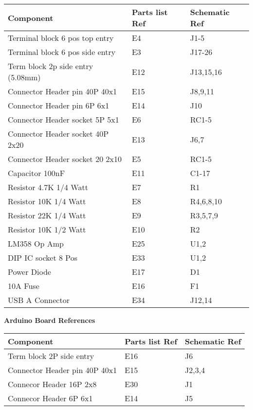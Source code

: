 \documentclass{article}
\begin{document}
\begin{table}[H]
	\centering
	\begin{tabular}{| l | l | l | }
		\hline 
		\textbf{Component} & \textbf{Parts list Ref} & \textbf{Schematic Ref} \\ \hline
		Terminal block 6 pos top entry  & E4 & J1-5 \\ \hline
		Terminal block 6 pos side entry & E3 & J17-26 \\ \hline
		Term block 2p side entry (5.08mm) & E12 & J13,15,16 \\ \hline
		Connector Header pin 40P 40x1 & E15 & J8,9,11 \\ \hline
		Connector Header pin 6P 6x1 & E14 & J10 \\ \hline
		Connector Header socket 5P 5x1 & E6 & RC1-5 \\ \hline
		Connector Header socket 40P 2x20 & E13 & J6,7 \\ \hline
		Connector Header socket 20 2x10 & E5 & RC1-5 \\ \hline
		Capacitor 100nF & E11 & C1-17 \\ \hline
		Resistor 4.7K 1/4 Watt  & E7 & R1 \\ \hline
		Resistor 10K 1/4 Watt & E8 & R4,6,8,10 \\ \hline
		Resistor 22K 1/4 Watt & E9 & R3,5,7,9 \\ \hline
		Resistor 10K 1/2 Watt & E10 & R2 \\ \hline
		LM358 Op Amp & E25 & U1,2 \\ \hline
		DIP IC socket 8 Pos & E33 & U1,2 \\ \hline
		Power Diode & E17 & D1 \\ \hline
		10A Fuse & E16 & F1 \\ \hline
		USB A Connector & E34 & J12,14 \\ \hline

	\end{tabular}
\end{table}

\bigskip 
\begin{frame}{}
  \centering \Huge
  \textbf{Arduino Board References}
\end{frame}

\begin{table}[H]
	\centering
	\begin{tabular}{| l | l | l | }
		\hline 
		\textbf{Component} & \textbf{Parts list Ref} & \textbf{Schematic Ref} \\ \hline
		Term block 2P side entry & E16 & J6 \\ \hline
		Connector Header pin 40P 40x1 & E15 & J2,3,4 \\ \hline
		Connecor Header 16P 2x8 & E30 & J1 \\ \hline
		Connecor Header 6P 6x1 & E14 & J5 \\ \hline 

	\end{tabular}
\end{table}
\end{document}
